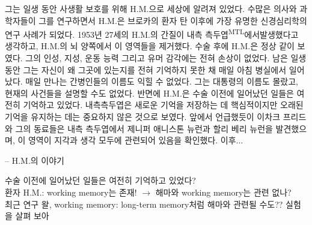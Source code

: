 \documentclass[../note.tex]{subfiles}
\begin{document}
\epigraph{
  그는 일생 동안 사생활 보호를 위해 H.M.으로 세상에 알려져 있었다.
  수많은 의사와 과학자들이 그를 연구하면서 H.M.은 브로카의 환자 탄 이후에 가장 유명한 신경심리학의 연구 사례가 되었다.
  1953년 27세의 H.M.의 간질이 내측 측두엽\textsuperscript{MTL}에서발생했다고 생각하고, H.M.의 뇌 양쪽에서 이 영역들을 제거했다.
  수술 후에 H.M.은 정상 같이 보였다. 그의 인성, 지성, 운동 능력 그리고 유머 감각에는 전혀 손상이 없었다.
  남은 일생 동안 그는 자신이 왜 그곳에 있는지를 전혀 기억하지 못한 채 매일 아침 병실에서 일어났다.
  매일 만나는 간병인들의 이름도 익힐 수 없었다.
  그는 대통령의 이름도 몰랐고, 현재의 사건들을 설명할 수도 없었다.
  반면에 H.M.은 수술 이전에 일어났던 일들은 여전히 기억하고 있었다.
  내측측두엽은 새로운 기억을 저장하는 데 핵심적이지만 오래된 기억을 유지하는 데는 중요하지 않은 것으로 보였다.
  앞에서 언급했듯이 이차크 프리드와 그의 동료들은 내측 측두엽에서 제니퍼 애니스톤 뉴런과 할리 베리 뉴런을 발견했으며, 이 영역이 지각과 생각 모두에
  관련되어 있음을 확인했다. 이후...
}{-- H.M.의 이야기}
수술 이전에 일어났던 일들은 여전히 기억하고 있었다?\\
환자 H.M.: working memory는 존재! $\rightarrow$ 해마와 working memory는 관련 없나?\\

최근 연구 왈, working memory: long-term memory처럼 해마와 관련될 수도??
실험을 살펴 보아\\
\end{document}
